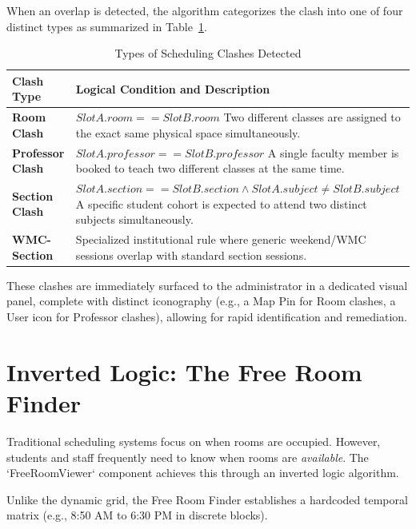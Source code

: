 When an overlap is detected, the algorithm categorizes the clash into one of four distinct types as summarized in Table~\ref{tab:clash_types}.



\begin{table}[htbp]
\centering
\caption{Types of Scheduling Clashes Detected}
\label{tab:clash_types}
\renewcommand{\arraystretch}{1.4}
\begin{tabularx}{\textwidth}{@{} l X @{}}
\toprule
\textbf{Clash Type} & \textbf{Logical Condition and Description} \\
\midrule
\textbf{Room Clash} & $SlotA.room == SlotB.room$ \newline Two different classes are assigned to the exact same physical space simultaneously. \\
\textbf{Professor Clash} & $SlotA.professor == SlotB.professor$ \newline A single faculty member is booked to teach two different classes at the same time. \\
\textbf{Section Clash} & $SlotA.section == SlotB.section \land SlotA.subject \neq SlotB.subject$ \newline A specific student cohort is expected to attend two distinct subjects simultaneously. \\
\textbf{WMC-Section} & Specialized institutional rule where generic weekend/WMC sessions overlap with standard section sessions. \\
\bottomrule
\end{tabularx}
\end{table}

These clashes are immediately surfaced to the administrator in a dedicated visual panel, complete with distinct iconography (e.g., a Map Pin for Room clashes, a User icon for Professor clashes), allowing for rapid identification and remediation.

\section{Inverted Logic: The Free Room Finder}

Traditional scheduling systems focus on when rooms are occupied. However, students and staff frequently need to know when rooms are \textit{available}. The `FreeRoomViewer` component achieves this through an inverted logic algorithm.

Unlike the dynamic grid, the Free Room Finder establishes a hardcoded temporal matrix (e.g., 8:50 AM to 6:30 PM in discrete blocks). 

